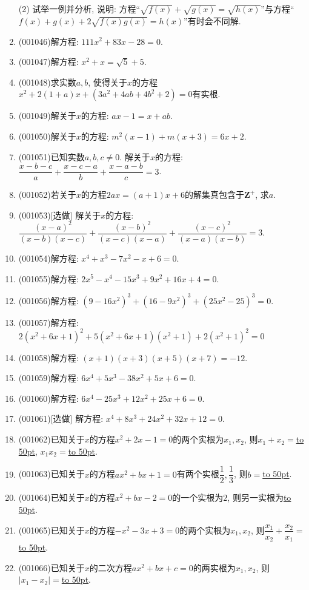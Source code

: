 \documentclass[10pt,a4paper]{article}
\newcommand{\blank}[1]{\underline{\hbox to #1pt{}}}
\begin{document}
\begin{enumerate}[1.]
(2) 试举一例并分析, 说明: 方程``$\sqrt{f(x)}+\sqrt{g(x)}=\sqrt{h(x)}$''与方程``$f(x)+g(x)+2\sqrt{f(x)g(x)}=h(x)$''有时会不同解.
\item {\tiny (001046)}解方程: $111x^2+83x-28=0$.
\item {\tiny (001047)}解方程: $x^2+x=\sqrt{5}+5$.
\item {\tiny (001048)}求实数$a,b$, 使得关于$x$的方程$x^2+2(1+a)x+(3a^2+4ab+4b^2+2)=0$有实根.
\item {\tiny (001049)}解关于$x$的方程: $ax-1=x+ab$.
\item {\tiny (001050)}解关于$x$的方程: $m^2(x-1)+m(x+3)=6x+2$.
\item {\tiny (001051)}已知实数$a,b,c \ne 0$. 解关于$x$的方程: $\dfrac{x-b-c}{a}+\dfrac{x-c-a}{b}+\dfrac{x-a-b}{c}=3$.
\item {\tiny (001052)}若关于$x$的方程$2ax=(a+1)x+6$的解集真包含于$\mathbf{Z}^+$, 求$a$.
\item {\tiny (001053)}[选做]
解关于$x$的方程: $\dfrac{(x-a)^2}{(x-b)(x-c)}+\dfrac{(x-b)^2}{(x-c)(x-a)}+\dfrac{(x-c)^2}{(x-a)(x-b)}=3$.
\item {\tiny (001054)}解方程: $x^4+x^3-7x^2-x+6=0$.
\item {\tiny (001055)}解方程: $2x^5-x^4-15x^3+9x^2+16x+4=0$.
\item {\tiny (001056)}解方程: $(9-16x^2)^3+(16-9x^2)^3+(25x^2-25)^3=0$.
\item {\tiny (001057)}解方程: $2(x^2+6x+1)^2+5(x^2+6x+1)(x^2+1)+2(x^2+1)^2=0$
\item {\tiny (001058)}解方程: $(x+1)(x+3)(x+5)(x+7)=-12$.
\item {\tiny (001059)}解方程: $6x^4+5x^3-38x^2+5x+6=0$.
\item {\tiny (001060)}解方程: $6x^4-25x^3+12x^2+25x+6=0$.
\item {\tiny (001061)}[选做]
解方程: $x^4+8x^3+24x^2+32x+12=0$.
\item {\tiny (001062)}已知关于$x$的方程$x^2+2x-1=0$的两个实根为$x_1,x_2$, 则$x_1+x_2=$\blank{50}, $x_1x_2=$\blank{50}.
\item {\tiny (001063)}已知关于$x$的方程$ax^2+bx+1=0$有两个实根$\dfrac{1}{2}, \dfrac{1}{3}$, 则$b=$\blank{50}.
\item {\tiny (001064)}已知关于$x$的方程$x^2+bx-2=0$的一个实根为$2$, 则另一实根为\blank{50}.
\item {\tiny (001065)}已知关于$x$的方程$-x^2-3x+3=0$的两个实根为$x_1,x_2$, 则$\dfrac{x_1}{x_2}+\dfrac{x_2}{x_1}=$\blank{50}.
\item {\tiny (001066)}已知关于$x$的二次方程$ax^2+bx+c=0$的两实根为$x_1,x_2$, 则$|x_1-x_2|=$\blank{50}.

\end{enumerate}
\end{document}
